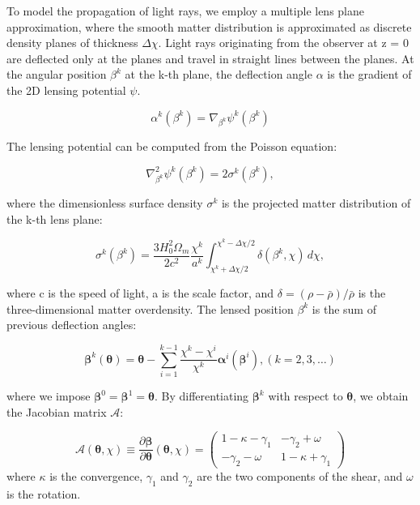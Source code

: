\documentclass[fleqn,usenatbib]{mnras}
\begin{document}
To model the propagation of light rays, we employ a multiple lens plane approximation, 
where the smooth matter distribution is approximated as discrete density planes of thickness $\Delta \chi$.
Light rays originating from the observer at z = 0 are deflected only at the planes and travel in straight lines between the planes.
At the angular position  $\beta^k$  at the k-th plane, the deflection angle $\alpha$ is the gradient of the 2D lensing potential $\psi$.

\begin{equation}
    \alpha^k(\beta^k) = \nabla_{\beta^k} \psi^k(\beta^k)
\end{equation}

The lensing potential can be computed from the Poisson equation:

\begin{equation}
    \nabla^2_{\beta^k} \psi^k(\beta^k) = 2 \sigma^k(\beta^k),
\end{equation}

where the dimensionless surface density $\sigma^k$ is the projected matter distribution of the k-th lens plane:

\begin{equation}
    \sigma^k(\beta^k) = \frac{3 H^2_0 \Omega_m}{2 c^2} \frac{\chi^k}{a^k} \int_{\chi^k + \Delta \chi/2}^{\chi^k - \Delta \chi/2} \delta(\beta^k, \chi) \, d\chi,
\end{equation}

where c is the speed of light, a is the scale factor, and $\delta = \left(\rho - \bar{\rho} \right) /\bar{\rho}$ is the three-dimensional matter overdensity. 
The lensed position $\beta^k$ is the sum of previous deflection angles:

\begin{equation}
    \boldsymbol{\beta}^k(\boldsymbol{\theta})=\boldsymbol{\theta}-\sum_{i=1}^{k-1} \frac{\chi^k-\chi^i}{\chi^k} \boldsymbol{\alpha}^i\left(\boldsymbol{\beta}^i\right),(k=2,3, \ldots)
\end{equation}

where we impose $\boldsymbol{\beta}^0=\boldsymbol{\beta}^1=\boldsymbol{\theta}$.
By differentiating $\boldsymbol{\beta}^k$ with respect to $\boldsymbol{\theta}$, 
we obtain the Jacobian matrix $\mathcal{A}$:

\begin{equation}
    \mathcal{A}(\boldsymbol{\theta}, \chi)\equiv \frac{\partial \boldsymbol{\beta}}{\partial \boldsymbol{\theta}}(\boldsymbol{\theta}, \chi)=
    \left(\begin{array}{cc}
        1 - \kappa - \gamma_1 & -\gamma_2 + \omega \\
        -\gamma_2 - \omega & 1 - \kappa + \gamma_1
    \end{array}\right)
\end{equation}
where $\kappa$ is the convergence, $\gamma_1$ and $\gamma_2$ are the two components of the shear, 
and $\omega$ is the rotation.
\end{document}
